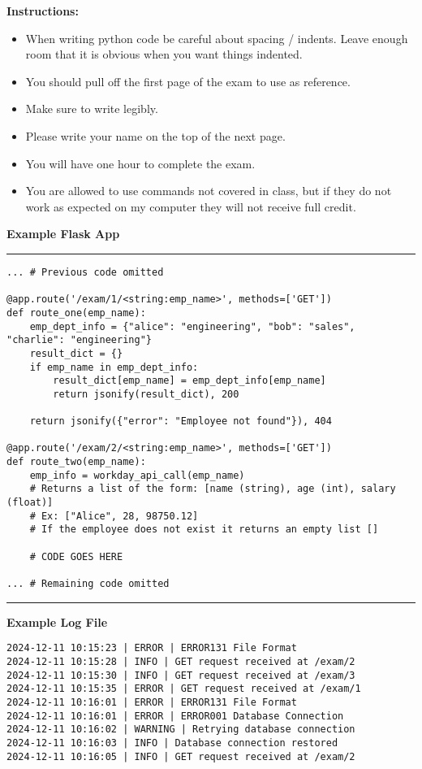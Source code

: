 \documentclass[11pt]{article}
\begin{document}
\noindent \textbf{Instructions:} \begin{itemize}
\item When writing python code be careful about spacing / indents. Leave enough room that it is obvious when you want things indented. 
\item You should pull off the first page of the exam to use as reference.
\item Make sure to write legibly.
\item Please write your name on the top of the next page.
\item You will have one hour to complete the exam.
\item You are allowed to use commands not covered in class, but if they do not work as expected on my computer they will not receive full credit.
\end{itemize}

{\bf Example Flask App }
\\
{\color{lightgray}\hrule}

\begin{verbatim}
... # Previous code omitted

@app.route('/exam/1/<string:emp_name>', methods=['GET'])
def route_one(emp_name):
    emp_dept_info = {"alice": "engineering", "bob": "sales", "charlie": "engineering"}
    result_dict = {}
    if emp_name in emp_dept_info:
        result_dict[emp_name] = emp_dept_info[emp_name]
        return jsonify(result_dict), 200
    
    return jsonify({"error": "Employee not found"}), 404

@app.route('/exam/2/<string:emp_name>', methods=['GET'])
def route_two(emp_name):
    emp_info = workday_api_call(emp_name)
    # Returns a list of the form: [name (string), age (int), salary (float)]
    # Ex: ["Alice", 28, 98750.12] 
    # If the employee does not exist it returns an empty list []
    
    # CODE GOES HERE

... # Remaining code omitted
\end{verbatim}
{\color{lightgray}\hrule}

\vspace{.5cm}

{\bf Example Log File}

\begin{verbatim}
2024-12-11 10:15:23 | ERROR | ERROR131 File Format
2024-12-11 10:15:28 | INFO | GET request received at /exam/2
2024-12-11 10:15:30 | INFO | GET request received at /exam/3
2024-12-11 10:15:35 | ERROR | GET request received at /exam/1
2024-12-11 10:16:01 | ERROR | ERROR131 File Format
2024-12-11 10:16:01 | ERROR | ERROR001 Database Connection
2024-12-11 10:16:02 | WARNING | Retrying database connection
2024-12-11 10:16:03 | INFO | Database connection restored
2024-12-11 10:16:05 | INFO | GET request received at /exam/2	
\end{verbatim}
\end{document}
